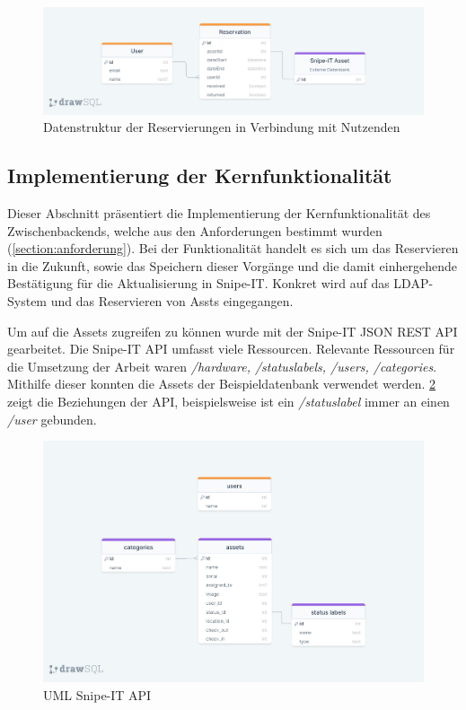 \begin{figure}[h]
  \centering
  \includegraphics[scale=0.2]{Bilder/drawSQL-export-2022-10-09_15 56.png}
  \caption[Datenstruktur der Reservierungen in Verbindung mit Nutzenden]{Datenstruktur der Reservierungen in Verbindung mit Nutzenden}
  \label{fig:orm}
\end{figure}


\subsection{Implementierung der Kernfunktionalität} 
Dieser Abschnitt präsentiert die Implementierung der Kernfunktionalität des Zwischenbackends, welche
aus den Anforderungen bestimmt wurden (\ref{section:anforderung}). Bei der Funktionalität handelt es
sich um das Reservieren in die Zukunft, sowie das Speichern dieser Vorgänge und die damit
einhergehende Bestätigung für die Aktualisierung in Snipe-IT. Konkret wird auf das LDAP-System und
das Reservieren von Assts eingegangen. 

Um auf die Assets zugreifen zu können wurde mit der Snipe-IT JSON REST API gearbeitet. Die Snipe-IT
API umfasst viele Ressourcen. Relevante Ressourcen für die Umsetzung der Arbeit waren
\textit{/hardware, /statuslabels, /users, /categories}. Mithilfe dieser konnten die Assets der
Beispieldatenbank verwendet werden. \ref{fig:snipe} zeigt die Beziehungen der API, beispielsweise
ist ein \textit{/statuslabel} immer an einen \textit{/user} gebunden. 

\begin{figure}[h]
  \centering
  \includegraphics[scale=0.2]{Bilder/drawSQL-export-2022-10-12_17 27.png}
  \caption[UML Snipe-IT API]{UML Snipe-IT API}
  \label{fig:snipe}
\end{figure}

